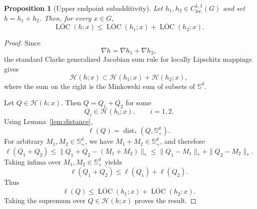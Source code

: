 \documentclass[10pt,a4paper]{amsart}
\newtheorem{proposition}{Proposition}
\newcommand{\Hess}{\mathcal H}
\newcommand{\LOC}{\operatorname{LOC}}
\newcommand{\Sd}{\mathbb S^d}
\newcommand{\Spd}{\mathbb S^d_+}
\newcommand{\dist}{\operatorname{dist}}
\begin{document}
	\begin{proposition}[Upper endpoint subadditivity]
		\label{prop:sum}
		Let \(h_1,h_2\in C^{1,1}_{\mathrm{loc}}(G)\) and set \(h=h_1+h_2\). Then, for every \(x\in G\),
		\[
		\overline{\LOC}(h;x)
		\leq
		\overline{\LOC}(h_1;x)
		+
		\overline{\LOC}(h_2;x).
		\]
	\end{proposition}

	\begin{proof}
		Since
		\[
		\nabla h=\nabla h_1+\nabla h_2,
		\]
		the standard Clarke generalized Jacobian sum rule for locally Lipschitz mappings gives
		\[
		\Hess(h;x)
		\subset
		\Hess(h_1;x)+\Hess(h_2;x),
		\]
		where the sum on the right is the Minkowski sum of subsets of \(\Sd\).
		
		Let \(Q\in\Hess(h;x)\). Then \(Q=Q_1+Q_2\) for some
		\[
		Q_i\in\Hess(h_i;x),
		\qquad i=1,2.
		\]
		Using Lemma~\ref{lem:distance},
		\[
		\ell(Q)
		=
		\dist_*(Q,\Spd).
		\]
		For arbitrary \(M_1,M_2\in\Spd\), we have \(M_1+M_2\in\Spd\), and therefore
		\[
		\ell(Q_1+Q_2)
		\leq
		\|Q_1+Q_2-(M_1+M_2)\|_*
		\leq
		\|Q_1-M_1\|_*+\|Q_2-M_2\|_*.
		\]
		Taking infima over \(M_1,M_2\in\Spd\) yields
		\[
		\ell(Q_1+Q_2)
		\leq
		\ell(Q_1)+\ell(Q_2).
		\]
		Thus
		\[
		\ell(Q)
		\leq
		\overline{\LOC}(h_1;x)+\overline{\LOC}(h_2;x).
		\]
		Taking the supremum over \(Q\in\Hess(h;x)\) proves the result.
	\end{proof}
\end{document}
